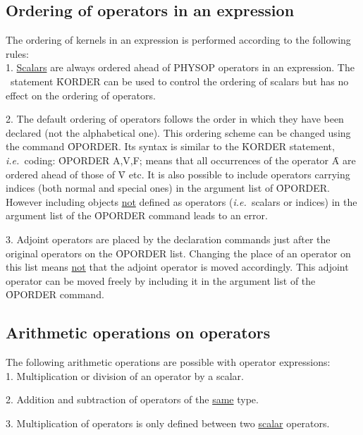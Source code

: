 \subsection{Ordering of operators in an expression}

The ordering of kernels in an expression is performed according to
the following rules: \\
1. \underline{Scalars} are always ordered ahead of
PHYSOP operators in an expression.
The \REDUCE\ statement \f{KORDER} can be used to control the
ordering of scalars but has no
effect on the ordering of operators.

2. The default ordering of operators follows the
order in which they have been declared (not the alphabetical one).
This ordering scheme can be changed using the command \f{OPORDER}.
Its syntax is similar to the \f{KORDER} statement, {\em i.e.\ }coding:
\f{OPORDER A,V,F;}
means that all occurrences of the operator \f{A} are ordered ahead of
those of \f{V} etc.  It is also possible to include operators
carrying
indices (both normal and special ones) in the argument list of
\f{OPORDER}. However including objects  \underline{not}
defined as operators ({\em i.e.\ }scalars or indices) in the argument list
of the \f{OPORDER} command leads to an error.

3. Adjoint operators are placed by the declaration commands just
after the original operators on the \f{OPORDER} list. Changing the
place of an operator on this list means \underline{not} that the
adjoint operator is moved accordingly. This adjoint operator can
be moved freely  by including it in the argument list of the
\f{OPORDER} command.

\subsection{Arithmetic operations on operators}

The following arithmetic operations are possible with
operator expressions: \\

1. Multiplication or division of an operator by a scalar.

2. Addition and subtraction of operators of the \underline{same}
type.

3. Multiplication of operators is only defined between two
\underline{scalar} operators.

